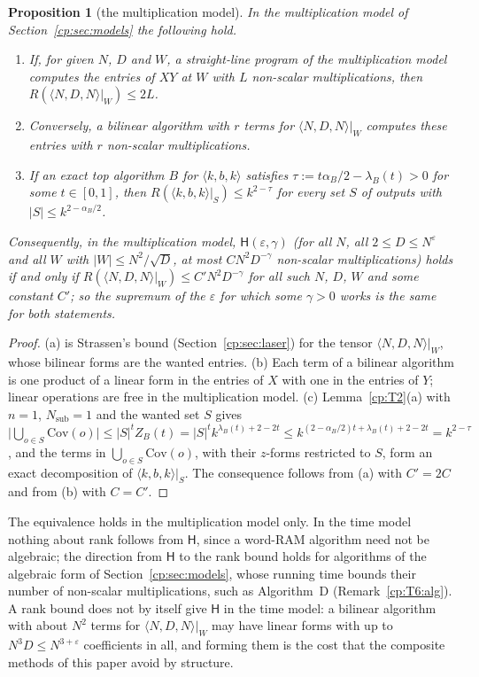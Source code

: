 \documentclass[11pt]{article}
\newtheorem{proposition}[theorem]{Proposition}
\theoremstyle{definition}
\theoremstyle{remark}
\providecommand{\eps}{\varepsilon}
\newcommand{\abs}[1]{\lvert #1\rvert}
\newcommand{\mat}[3]{\langle #1,#2,#3\rangle} %
\newcommand{\Hyp}{\mathsf{H}}                 %
\newcommand{\Cov}{\mathrm{Cov}}               %
\newcommand{\ZB}{Z_B}                         %
\newcommand{\lamB}{\lambda_B}                 %
\newcommand{\alB}{\alpha_B}                   %
\newcommand{\AlgD}{Algorithm~D}                             %
\begin{document}
\begin{proposition}[the multiplication model]\label{cp:C17}
In the multiplication model of Section~\ref{cp:sec:models} the following hold.
\begin{enumerate}[label=(\alph*)]
\item If, for given $N$, $D$ and $W$, a straight-line program of the multiplication model computes the entries of $XY$ at $W$ with $L$ non-scalar multiplications, then $R(\mat NDN|_W)\le2L$.
\item Conversely, a bilinear algorithm with $r$ terms for $\mat NDN|_W$ computes these entries with $r$ non-scalar multiplications.
\item If an exact top algorithm $B$ for $\mat kbk$ satisfies $\tau:=t\alB/2-\lamB(t)>0$ for some $t\in[0,1]$, then $R(\mat kbk|_S)\le k^{2-\tau}$ for every set $S$ of outputs with $\abs S\le k^{2-\alB/2}$.
\end{enumerate}
Consequently, in the multiplication model, $\Hyp(\eps,\gamma)$ (for all $N$, all $2\le D\le N^\eps$ and all $W$ with $\abs W\le N^2/\sqrt D$, at most $CN^2D^{-\gamma}$ non-scalar multiplications) holds if and only if $R(\mat NDN|_W)\le C'N^2D^{-\gamma}$ for all such $N$, $D$, $W$ and some constant $C'$; so the supremum of the $\eps$ for which some $\gamma>0$ works is the same for both statements.
\end{proposition}

\begin{proof}
(a) is Strassen's bound (Section~\ref{cp:sec:laser}) for the tensor $\mat NDN|_W$, whose bilinear forms are the wanted entries. (b) Each term of a bilinear algorithm is one product of a linear form in the entries of $X$ with one in the entries of $Y$; linear operations are free in the multiplication model. (c) Lemma~\ref{cp:T2}(a) with $n=1$, $N_{\mathrm{sub}}=1$ and the wanted set $S$ gives $\abs{\bigcup_{o\in S}\Cov(o)}\le\abs S^t\ZB(t)=\abs S^tk^{\lamB(t)+2-2t}\le k^{(2-\alB/2)t+\lamB(t)+2-2t}=k^{2-\tau}$, and the terms in $\bigcup_{o\in S}\Cov(o)$, with their $z$-forms restricted to $S$, form an exact decomposition of $\mat kbk|_S$. The consequence follows from (a) with $C'=2C$ and from (b) with $C=C'$.
\end{proof}

The equivalence holds in the multiplication model only. In the time model nothing about rank follows from $\Hyp$, since a word-RAM algorithm need not be algebraic; the direction from $\Hyp$ to the rank bound holds for algorithms of the algebraic form of Section~\ref{cp:sec:models}, whose running time bounds their number of non-scalar multiplications, such as \AlgD{} (Remark~\ref{cp:T6:alg}). A rank bound does not by itself give $\Hyp$ in the time model: a bilinear algorithm with about $N^2$ terms for $\mat NDN|_W$ may have linear forms with up to $N^3D\le N^{3+\eps}$ coefficients in all, and forming them is the cost that the composite methods of this paper avoid by structure.
\end{document}
